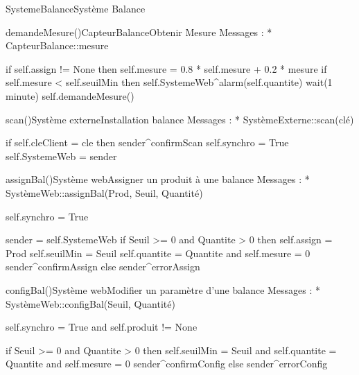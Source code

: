 \begin{OM}{SystemeBalance}{Système Balance}

\begin{OMOperation}{demandeMesure()}{CapteurBalance}{Obtenir Mesure}
Messages :
* CapteurBalance::{mesure}
\begin{OMPre}
\end{OMPre}
\begin{OMPost}
if self.assign != None then
self.mesure = 0.8 * self.mesure + 0.2 * mesure
if self.mesure < self.seuilMin then
        self.SystemeWeb^alarm(self.quantite)
wait(1 minute)
self.demandeMesure()
\end{OMPost}
\end{OMOperation}

\begin{OMOperation}{scan()}{Système externe}{Installation balance}
Messages :
* SystèmeExterne::{scan(clé)}
\begin{OMPre}
\end{OMPre}
\begin{OMPost}
if self.cleClient = cle then
sender^confirmScan
self.synchro = True
self.SystemeWeb = sender
\end{OMPost}
\end{OMOperation}

\begin{OMOperation}{assignBal()}{Système web}{Assigner un produit à une balance}
Messages :
* SystèmeWeb::{assignBal(Prod, Seuil, Quantité)}
\begin{OMPre}
self.synchro = True
\end{OMPre}
\begin{OMPost}
sender = self.SystemeWeb
if Seuil >= 0 and Quantite > 0 then
self.assign = Prod
self.seuilMin = Seuil
self.quantite = Quantite and
self.mesure = 0
sender^confirmAssign
else
        sender^errorAssign
    \end{OMPost}
\end{OMOperation}

\begin{OMOperation}{configBal()}{Système web}{Modifier un paramètre d'une balance}
Messages :
* SystèmeWeb::{configBal(Seuil, Quantité)}
\begin{OMPre}
self.synchro = True and self.produit != None
\end{OMPre}
\begin{OMPost}
if Seuil >= 0 and Quantite > 0 then
self.seuilMin = Seuil
and self.quantite = Quantite and
self.mesure = 0
sender^confirmConfig
else
        sender^errorConfig
    \end{OMPost}
\end{OMOperation}
\end{OM}
